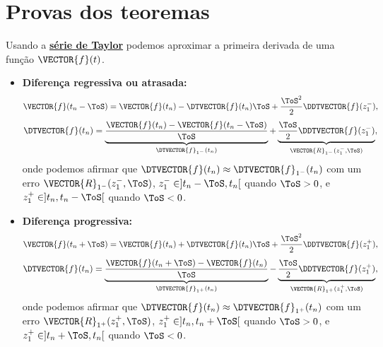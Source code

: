 \section{Provas dos teoremas}


\begin{myproofT}\label{proof:teo:diferenças-finitas:1}
Usando a \hyperref[def:taylor]{\textbf{série de Taylor}} podemos aproximar 
a primeira derivada de uma função $\VECTOR{f}(t)$.
\begin{itemize}
\item \textbf{Diferença regressiva ou atrasada:}
\begin{equation}
\VECTOR{f}(t_n-\ToS) = \VECTOR{f}(t_n)-\DTVECTOR{f}(t_n)\ToS +\frac{\ToS^2}{2}\DDTVECTOR{f}(z_{1}^{-}),
\end{equation}
\begin{equation}
\DTVECTOR{f}(t_n)=\underbrace{\frac{\VECTOR{f}(t_n)-\VECTOR{f}(t_n-\ToS)}{\ToS}}_{\DTVECTOR{f}_{1^{-}}(t_n)}+
\underbrace{\frac{\ToS}{2}\DDTVECTOR{f}(z_{1}^{-})}_{\VECTOR{R}_{1^{-}}(z_{1}^{-},\ToS)},
\end{equation}
onde podemos afirmar que $\DTVECTOR{f}(t_n)\approx \DTVECTOR{f}_{1^{-}}(t_n)$ com um erro $\VECTOR{R}_{1^{-}}(z_{1}^{-},\ToS)$,
$z_{1}^{-} \in ]t_n-\ToS,t_n[$ quando $\ToS>0$, e $z_{1}^{+} \in ]t_n,t_n-\ToS[$ quando $\ToS<0$.

\item \textbf{Diferença progressiva:}
\begin{equation}
\VECTOR{f}(t_n+\ToS) = \VECTOR{f}(t_n)+\DTVECTOR{f}(t_n)\ToS +\frac{\ToS^2}{2}\DDTVECTOR{f}(z_{1}^{+}),
\end{equation}
\begin{equation}
\DTVECTOR{f}(t_n)=\underbrace{\frac{\VECTOR{f}(t_n+\ToS) - \VECTOR{f}(t_n)}{\ToS}}_{\DTVECTOR{f}_{1^{+}}(t_n)}-
\underbrace{\frac{\ToS}{2}\DDTVECTOR{f}(z_{1}^{+})}_{\VECTOR{R}_{1^{+}}(z_{1}^{+},\ToS)},
\end{equation}
onde podemos afirmar que $\DTVECTOR{f}(t_n)\approx \DTVECTOR{f}_{1^{+}}(t_n)$ com um erro $\VECTOR{R}_{1^{+}}(z_{1}^{+},\ToS)$,
$z_{1}^{+} \in ]t_n,t_n+\ToS[$ quando $\ToS>0$, e $z_{1}^{+} \in ]t_n+\ToS,t_n[$ quando $\ToS<0$.


\end{itemize}
\end{myproofT}
